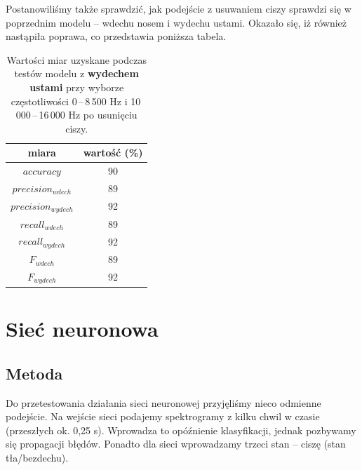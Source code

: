 \documentclass[polish]{article}
\begin{document}
Postanowiliśmy także sprawdzić, jak podejście z usuwaniem ciszy sprawdzi się w poprzednim modelu -- wdechu nosem i wydechu ustami. Okazało się, iż również nastąpiła poprawa, co przedstawia poniższa tabela.
\begin{table}[H]
\caption{Wartości miar uzyskane podczas testów modelu z \textbf{wydechem ustami} przy wyborze częstotliwości 0\,--\,8\,500 \unit{Hz} i 10\,000\,--\,16\,000 \unit{Hz} po usunięciu ciszy.}
\begin{center}
\begin{tabular}{c | c}
	miara & wartość (\%) \\
	\hline
	$accuracy$ & 90 \\
	$precision_{wdech}$ & 89 \\
	$precision_{wydech}$ & 92 \\
	$recall_{wdech}$ & 89 \\
	$recall_{wydech}$ & 92 \\
	$F_{wdech}$ & 89 \\
	$F_{wydech}$ & 92
\end{tabular}
\end{center}
\end{table}

\section{Sieć neuronowa}
\subsection{Metoda}
Do przetestowania działania sieci neuronowej przyjęliśmy nieco odmienne podejście. Na wejście sieci podajemy spektrogramy z kilku chwil w czasie (przeszłych ok. 0,25 s). 
Wprowadza to opóźnienie klasyfikacji, jednak pozbywamy się propagacji błędów. Ponadto dla sieci wprowadzamy trzeci stan -- ciszę (stan tła/bezdechu).
\end{document}

